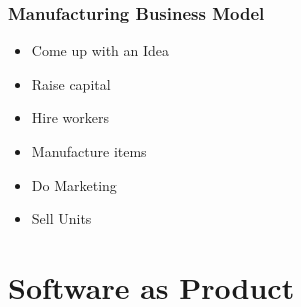 \documentclass[18pt]{beamer}
\begin{document}
\begin{frame}
\frametitle{Manufacturing Business Model}
\Huge
\begin{itemize}
\item Come up with an Idea
\pause
\item Raise capital
\pause
\item Hire workers
\pause
\item Manufacture items
\pause
\item Do Marketing
\pause
\item Sell Units
\end{itemize}
\end{frame}


\section{Software as Product}
\end{document}
